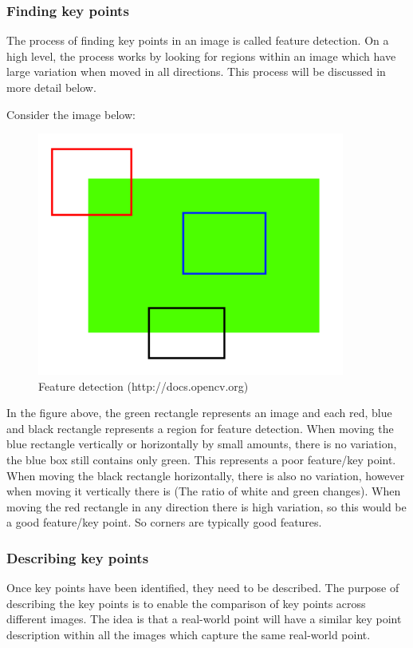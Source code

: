 \documentclass[11pt,a4paper]{report}
\begin{document}
			\subsubsection{Finding key points}
				The process of finding key points in an image is called feature detection. On a high level, the process works by looking for regions within an image which have large variation when moved in all directions. This process will be discussed in more detail below.
				
				Consider the image below:
				
				\begin{figure}[H]
					\centering
					\includegraphics[width=0.9\textwidth]{feature_detection}
					\caption{Feature detection (http://docs.opencv.org)}
				\end{figure}
				
				In the figure above, the green rectangle represents an image and each red, blue and black rectangle represents a region for feature detection. When moving the blue rectangle vertically or horizontally by small amounts, there is no variation, the blue box still contains only green. This represents a poor feature/key point. 
				When moving the black rectangle horizontally, there is also no variation, however when moving it vertically there is (The ratio of white and green changes). When moving the red rectangle in any direction there is high variation, so this would be a good feature/key point. So corners are typically good features.
				
			\subsubsection{Describing key points}
				Once key points have been identified, they need to be described. The purpose of describing the key points is to enable the comparison of key points across different images. The idea is that a real-world point will have a similar key point description within all the images which capture the same real-world point.
				
\end{document}

